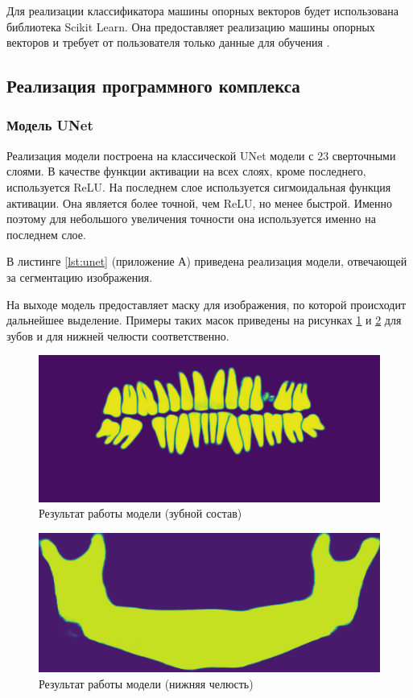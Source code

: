 Для реализации классификатора машины опорных векторов будет использована библиотека Scikit Learn. Она предоставляет реализацию машины опорных векторов и требует от пользователя только данные для обучения \cite{scikitsvm}.

\subsection{Реализация программного комплекса}

\subsubsection{Модель UNet}

Реализация модели построена на классической UNet модели с 23 сверточными слоями. В качестве функции активации на всех слоях, кроме последнего, используется ReLU. На последнем слое используется сигмоидальная функция активации. Она является более точной, чем ReLU, но менее быстрой. Именно поэтому для небольшого увеличения точности она используется именно на последнем слое.

В листинге \ref{lst:unet} (приложение А) приведена реализация модели, отвечающей за сегментацию изображения.

На выходе модель предоставляет маску для изображения, по которой происходит дальнейшее выделение. Примеры таких масок приведены на рисунках \ref{fig:mask} и \ref{fig:maskmand} для зубов и для нижней челюсти соответственно.

\begin{figure}[H]
	\centering
	\includegraphics[width=\textwidth]{img/mask.png}
	\caption{Результат работы модели (зубной состав)}
	\label{fig:mask}
\end{figure}


\begin{figure}[H]
	\centering
	\includegraphics[width=\textwidth]{img/maskmand.png}
	\caption{Результат работы модели (нижняя челюсть)}
	\label{fig:maskmand}
\end{figure}

